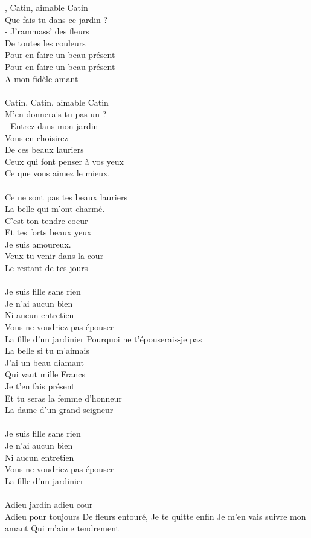 
, Catin, aimable Catin
\\Que fais-tu dans ce jardin ?
\\- J'rammass' des fleurs
\\De toutes les couleurs
\\Pour en faire un beau présent
\\Pour en faire un beau présent
\\A mon fidèle amant
\\\\Catin, Catin, aimable Catin
\\M'en donnerais-tu pas un ?
\\- Entrez dans mon jardin
\\Vous en choisirez
\\De ces beaux lauriers
\\Ceux qui font penser à vos yeux
\\Ce que vous aimez le mieux.
\\\\Ce ne sont pas tes beaux lauriers
\\La belle qui m'ont charmé.
\\C'est ton tendre coeur
\\Et tes forts beaux yeux
\\Je suis amoureux.
\\Veux-tu venir dans la cour
\\Le restant de tes jours
\\\\Je suis fille sans rien
\\Je n'ai aucun bien
\\Ni aucun entretien
\\Vous ne voudriez pas épouser
\\La fille d'un jardinier
\breakpage
Pourquoi ne t'épouserais-je pas
\\La belle si tu m'aimais
\\J'ai un beau diamant
\\Qui vaut mille Francs
\\Je t'en fais présent
\\Et tu seras la femme d'honneur 
\\La dame d'un grand seigneur
\\\\Je suis fille sans rien
\\Je n'ai aucun bien
\\Ni aucun entretien
\\Vous ne voudriez pas épouser
\\La fille d'un jardinier
\\\\Adieu jardin adieu cour
\\Adieu pour toujours
{De fleurs entouré,}
{Je te quitte enfin}
{Je m'en vais suivre mon amant}
{Qui m'aime tendrement}

